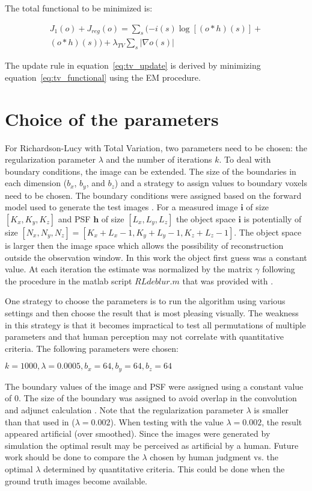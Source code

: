 \documentclass[conference,a4paper]{IEEEtran}
\begin{document}
The total functional to be minimized is:

\begin{multline} \label{eq:tv_functional}
	{J_{1}(o)} + {J_{reg}(o)} = \sum_{s}(-i(s)\log[(o*h)(s)]+\\
(o*h)(s))+\lambda_{TV}\sum_{s}|\nabla{o(s)}|
\end{multline}

The update rule in equation~\ref{eq:tv_update} is derived by minimizing equation~\ref{eq:tv_functional} using the EM procedure. 


\section{Choice of the parameters}

For Richardson-Lucy with Total Variation, two parameters need to be chosen: the regularization parameter $\lambda$ and the number of iterations $k$.  To deal with boundary conditions, the image can be extended.  The size of the boundaries in each dimension ($b_x$, $b_y$, and $b_z$) and a strategy to assign values to boundary voxels need to be chosen.  The boundary conditions were assigned based on the forward model used to generate the test images \cite{vonesch2013}.  For a measured image $\mathbf{i}$ of size $[K_{x}, K_{y}, K_{z}]$ and PSF $\mathbf{h}$ of size $[L_{x}, L_{y}, L_{z}]$ the object space $\mathbf{i}$ is potentially of size $[N_{x}, N_{y}, N_{z}]=[K_{x}+L_{x}-1, K_{y}+L_{y}-1, K_{z}+L_{z}-1]$.  The object space is larger then the image space which allows the possibility of reconstruction outside the observation window.   In this work the object first guess was a constant value.  At each iteration the estimate was normalized by the matrix $\gamma$ following the procedure in the matlab script $RLdeblur.m$ that was provided with \cite{vonesch2013}.

One strategy to choose the parameters is to run the algorithm using various settings and then choose the result that is most pleasing visually.  The weakness in this strategy is that it becomes impractical to test all permutations of multiple parameters and that human perception may not correlate with quantitative criteria.  The following parameters were chosen:

$ k=1000, \lambda=0.0005, b_x=64, b_y=64, b_z=64 $

The boundary values of the image and PSF were assigned using a constant value of 0.  The size of the boundary was assigned to avoid overlap in the convolution and adjunct calculation \cite{vonesch2013}.  Note that the regularization parameter $\lambda$ is smaller than that used in \cite{dey2006} ($\lambda=0.002$).  When testing with the value $\lambda=0.002$, the result appeared artificial (over smoothed). Since the images were generated by simulation the optimal result may be perceived as artificial by a human. \newpage Future work should be done to compare the $\lambda$ chosen by human judgment vs. the optimal $\lambda$ determined by quantitative criteria. This could be done when the ground truth images become available. 
\end{document}
